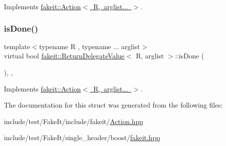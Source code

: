 Implements \mbox{\hyperlink{structfakeit_1_1Action_a0b9ab2c889a54c07dcaa8efc101a5cbc}{fakeit\+::\+Action$<$ R, arglist... $>$}}.

\mbox{\label{structfakeit_1_1ReturnDelegateValue_ac6c33b7d5fff3fedeec91a4780924b84}} 
\subsubsection{\texorpdfstring{isDone()}{isDone()}\hspace{0.1cm}{\footnotesize\ttfamily [9/9]}}
{\footnotesize\ttfamily template$<$typename R , typename ... arglist$>$ \\
virtual bool \mbox{\hyperlink{structfakeit_1_1ReturnDelegateValue}{fakeit\+::\+Return\+Delegate\+Value}}$<$ R, arglist $>$\+::is\+Done (\begin{DoxyParamCaption}{ }\end{DoxyParamCaption})\hspace{0.3cm}{\ttfamily [inline]}, {\ttfamily [override]}, {\ttfamily [virtual]}}



Implements \mbox{\hyperlink{structfakeit_1_1Action_a0b9ab2c889a54c07dcaa8efc101a5cbc}{fakeit\+::\+Action$<$ R, arglist... $>$}}.



The documentation for this struct was generated from the following files\+:\begin{DoxyCompactItemize}
\item 
include/test/\+Fake\+It/include/fakeit/\mbox{\hyperlink{Action_8hpp}{Action.\+hpp}}\item 
include/test/\+Fake\+It/single\+\_\+header/boost/\mbox{\hyperlink{single__header_2boost_2fakeit_8hpp}{fakeit.\+hpp}}\end{DoxyCompactItemize}
